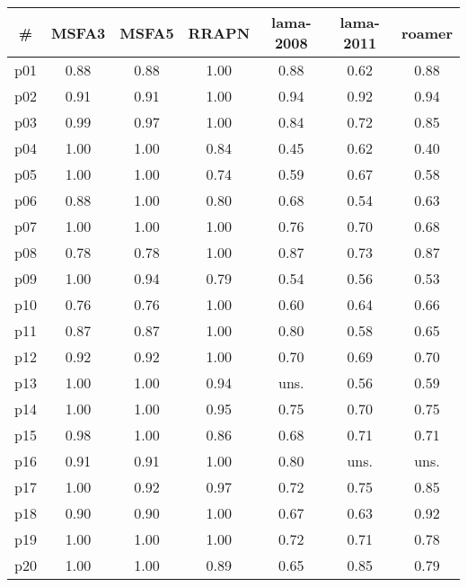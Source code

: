 \begin{tabular}{ccccccc}
\toprule
\textbf{\#} & \textbf{MSFA3} & \textbf{MSFA5} & \textbf{RRAPN} & \textbf{lama-2008} & \textbf{lama-2011} & \textbf{roamer}\\
\midrule
p01 & 0.88 & 0.88 & 1.00 & 0.88 & 0.62 & 0.88\\
p02 & 0.91 & 0.91 & 1.00 & 0.94 & 0.92 & 0.94\\
p03 & 0.99 & 0.97 & 1.00 & 0.84 & 0.72 & 0.85\\
p04 & 1.00 & 1.00 & 0.84 & 0.45 & 0.62 & 0.40\\
p05 & 1.00 & 1.00 & 0.74 & 0.59 & 0.67 & 0.58\\
p06 & 0.88 & 1.00 & 0.80 & 0.68 & 0.54 & 0.63\\
p07 & 1.00 & 1.00 & 1.00 & 0.76 & 0.70 & 0.68\\
p08 & 0.78 & 0.78 & 1.00 & 0.87 & 0.73 & 0.87\\
p09 & 1.00 & 0.94 & 0.79 & 0.54 & 0.56 & 0.53\\
p10 & 0.76 & 0.76 & 1.00 & 0.60 & 0.64 & 0.66\\
p11 & 0.87 & 0.87 & 1.00 & 0.80 & 0.58 & 0.65\\
p12 & 0.92 & 0.92 & 1.00 & 0.70 & 0.69 & 0.70\\
p13 & 1.00 & 1.00 & 0.94 & uns. & 0.56 & 0.59\\
p14 & 1.00 & 1.00 & 0.95 & 0.75 & 0.70 & 0.75\\
p15 & 0.98 & 1.00 & 0.86 & 0.68 & 0.71 & 0.71\\
p16 & 0.91 & 0.91 & 1.00 & 0.80 & uns. & uns.\\
p17 & 1.00 & 0.92 & 0.97 & 0.72 & 0.75 & 0.85\\
p18 & 0.90 & 0.90 & 1.00 & 0.67 & 0.63 & 0.92\\
p19 & 1.00 & 1.00 & 1.00 & 0.72 & 0.71 & 0.78\\
p20 & 1.00 & 1.00 & 0.89 & 0.65 & 0.85 & 0.79\\
\bottomrule
\end{tabular}

